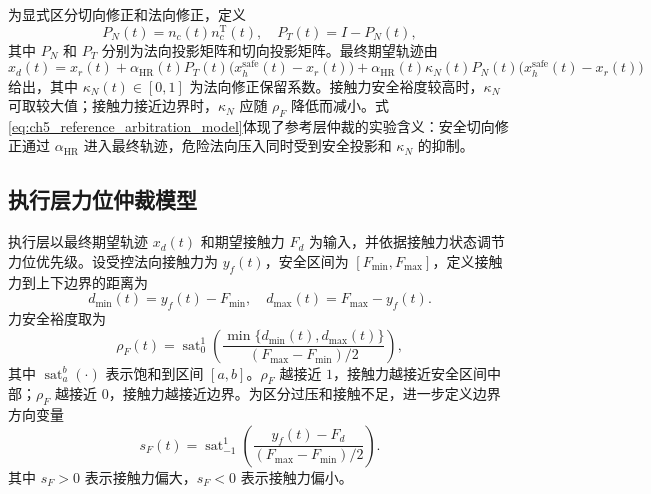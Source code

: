 为显式区分切向修正和法向修正，定义
\begin{equation}
  P_N(t)=n_c(t)n_c^{\mathrm T}(t),
  \quad
  P_T(t)=I-P_N(t),
  \label{eq:ch5_tangent_normal_projectors}
\end{equation}
其中 $P_N$ 和 $P_T$ 分别为法向投影矩阵和切向投影矩阵。最终期望轨迹由
\begin{equation}
  x_d(t)=x_r(t)+
  \alpha_{\mathrm{HR}}(t)P_T(t)\bigl(x_h^{\mathrm{safe}}(t)-x_r(t)\bigr)+
  \alpha_{\mathrm{HR}}(t)\kappa_N(t)P_N(t)\bigl(x_h^{\mathrm{safe}}(t)-x_r(t)\bigr)
  \label{eq:ch5_reference_arbitration_model}
\end{equation}
给出，其中 $\kappa_N(t)\in[0,1]$ 为法向修正保留系数。接触力安全裕度较高时，$\kappa_N$ 可取较大值；接触力接近边界时，$\kappa_N$ 应随 $\rho_F$ 降低而减小。式\eqref{eq:ch5_reference_arbitration_model}体现了参考层仲裁的实验含义：安全切向修正通过 $\alpha_{\mathrm{HR}}$ 进入最终轨迹，危险法向压入同时受到安全投影和 $\kappa_N$ 的抑制。

\subsection{执行层力位仲裁模型}
\label{subsec:ch5_force_position_model}

执行层以最终期望轨迹 $x_d(t)$ 和期望接触力 $F_d$ 为输入，并依据接触力状态调节力位优先级。设受控法向接触力为 $y_f(t)$，安全区间为 $[F_{\min},F_{\max}]$，定义接触力到上下边界的距离为
\begin{equation}
  d_{\min}(t)=y_f(t)-F_{\min},
  \quad
  d_{\max}(t)=F_{\max}-y_f(t).
  \label{eq:ch5_force_boundary_distance}
\end{equation}
力安全裕度取为
\begin{equation}
  \rho_F(t)=
  \operatorname{sat}_{0}^{1}
  \left(
  \frac{\min\{d_{\min}(t),d_{\max}(t)\}}
  {(F_{\max}-F_{\min})/2}
  \right),
  \label{eq:ch5_force_margin_model}
\end{equation}
其中 $\operatorname{sat}_{a}^{b}(\cdot)$ 表示饱和到区间 $[a,b]$。$\rho_F$ 越接近 $1$，接触力越接近安全区间中部；$\rho_F$ 越接近 $0$，接触力越接近边界。为区分过压和接触不足，进一步定义边界方向变量
\begin{equation}
  s_F(t)=
  \operatorname{sat}_{-1}^{1}
  \left(
  \frac{y_f(t)-F_d}{(F_{\max}-F_{\min})/2}
  \right).
  \label{eq:ch5_force_direction_model}
\end{equation}
其中 $s_F>0$ 表示接触力偏大，$s_F<0$ 表示接触力偏小。

